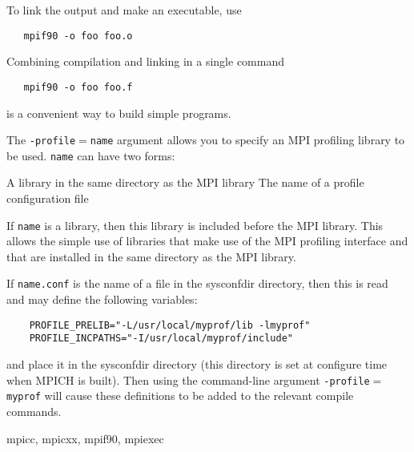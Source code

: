 \par
To link the output and make an executable, use
\begin{verbatim}
   mpif90 -o foo foo.o
\end{verbatim}

Combining compilation and linking in a single command
\begin{verbatim}
   mpif90 -o foo foo.f
\end{verbatim}

is a convenient way to build simple programs.
\par
{}
The {\tt -profile$=$name} argument allows you to specify an MPI profiling
library to be used.  {\tt name} can have two forms:
\par
\nextline
A library in the same directory as the MPI library
\nextline
The name of a profile configuration file
\nextline
\par
If {\tt name} is a library, then this library is included before the MPI
library.  This allows the simple use of libraries that make use of the
MPI profiling interface and that are installed in the same directory as
the MPI library.
\par
If {\tt name.conf} is the name of a file in the sysconfdir directory, then this
is read and may define the following variables:
\par
\begin{verbatim}
    PROFILE_PRELIB="-L/usr/local/myprof/lib -lmyprof"
    PROFILE_INCPATHS="-I/usr/local/myprof/include"
\end{verbatim}

and place it in the sysconfdir directory (this directory is set at
configure time when MPICH is built).  Then using the command-line
argument {\tt -profile$=$myprof} will cause these
definitions to be added to the relevant compile commands.
\par
{}
 mpicc, mpicxx, mpif90, mpiexec
\nextline
{}
\endmanpage
